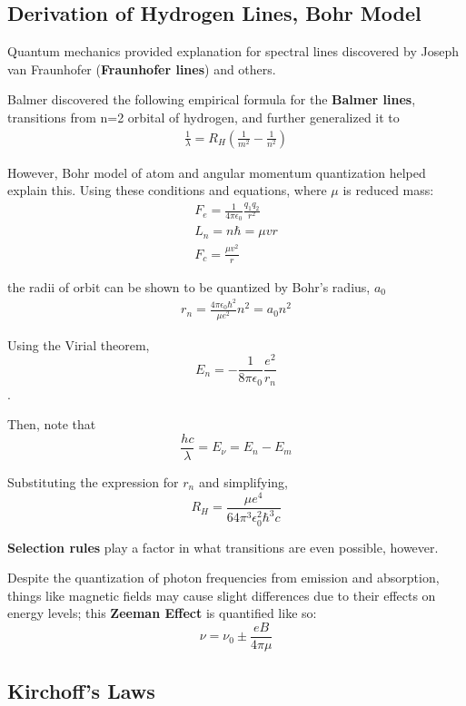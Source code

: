 \documentclass[12pt]{article}
\begin{document}
\subsection{Derivation of Hydrogen Lines, Bohr Model}

Quantum mechanics provided explanation for spectral lines discovered by Joseph van Fraunhofer (\textbf{Fraunhofer lines}) and others.

Balmer discovered the following empirical formula for the \textbf{Balmer lines}, transitions from n=2 orbital of hydrogen, and further generalized it to
\begin{align*}
    \frac{1}{\lambda} = R_H\left(\frac{1}{m^2} - \frac{1}{n^2}\right)
\end{align*}

However, Bohr model of atom and angular momentum quantization helped explain this. Using these conditions and equations, where $\mu$ is reduced mass:
\begin{align*}
    F_e = \frac{1}{4\pi\epsilon_0}\frac{q_1q_2}{r^2} \\
    L_n = n\hbar = \mu vr \\
    F_c = \frac{\mu v^2}{r}
\end{align*}

the radii of orbit can be shown to be quantized by Bohr's radius, $a_0$
\begin{align*}
    r_n = \frac{4\pi\epsilon_0\hbar^2}{\mu e^2}n^2 = a_0n^2
\end{align*}

Using the Virial theorem, $$E_n = -\frac{1}{8\pi\epsilon_0}\frac{e^2}{r_n}$$.

Then, note that $$ \frac{hc}{\lambda} = E_{\nu} = E_n - E_m $$

Substituting the expression for $r_n$ and simplifying, $$R_H = \frac{\mu e^4}{64\pi^3\epsilon_0^2\hbar^3c}$$

\textbf{Selection rules} play a factor in what transitions are even possible, however.

Despite the quantization of photon frequencies from emission and absorption, things like magnetic fields may cause slight differences due to their effects on energy levels; this \textbf{Zeeman Effect} is quantified like so: $$\nu = \nu_0 \pm \frac{eB}{4\pi\mu}$$

\subsection{Kirchoff's Laws}
\end{document}
